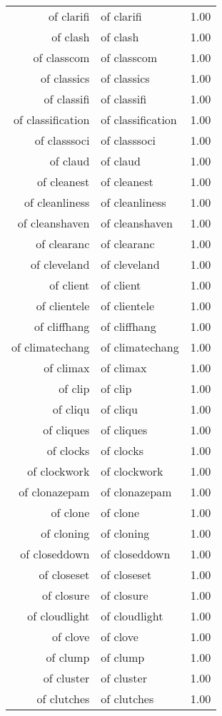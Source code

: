 \begin{table}[ht]
\begin{tabular}{rlr}
  of clarifi & of clarifi & 1.00 \\ 
  of clash & of clash & 1.00 \\ 
  of classcom & of classcom & 1.00 \\ 
  of classics & of classics & 1.00 \\ 
  of classifi & of classifi & 1.00 \\ 
  of classification & of classification & 1.00 \\ 
  of classsoci & of classsoci & 1.00 \\ 
  of claud & of claud & 1.00 \\ 
  of cleanest & of cleanest & 1.00 \\ 
  of cleanliness & of cleanliness & 1.00 \\ 
  of cleanshaven & of cleanshaven & 1.00 \\ 
  of clearanc & of clearanc & 1.00 \\ 
  of cleveland & of cleveland & 1.00 \\ 
  of client & of client & 1.00 \\ 
  of clientele & of clientele & 1.00 \\ 
  of cliffhang & of cliffhang & 1.00 \\ 
  of climatechang & of climatechang & 1.00 \\ 
  of climax & of climax & 1.00 \\ 
  of clip & of clip & 1.00 \\ 
  of cliqu & of cliqu & 1.00 \\ 
  of cliques & of cliques & 1.00 \\ 
  of clocks & of clocks & 1.00 \\ 
  of clockwork & of clockwork & 1.00 \\ 
  of clonazepam & of clonazepam & 1.00 \\ 
  of clone & of clone & 1.00 \\ 
  of cloning & of cloning & 1.00 \\ 
  of closeddown & of closeddown & 1.00 \\ 
  of closeset & of closeset & 1.00 \\ 
  of closure & of closure & 1.00 \\ 
  of cloudlight & of cloudlight & 1.00 \\ 
  of clove & of clove & 1.00 \\ 
  of clump & of clump & 1.00 \\ 
  of cluster & of cluster & 1.00 \\ 
  of clutches & of clutches & 1.00 \\ 

\end{tabular}
\end{table}
